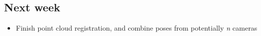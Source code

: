\documentclass[a4paper]{article}
\begin{document}
\subsection{Next week}
\begin{itemize}
\item Finish point cloud registration, and combine poses from potentially \emph{n} cameras
\end{itemize}
\end{document}
